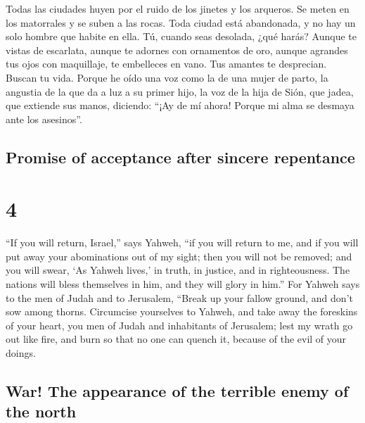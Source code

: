 \begin{paracol}{2}
 Todas las ciudades huyen por el ruido de los jinetes y
los arqueros. Se meten en los matorrales y se suben a las rocas. Toda
ciudad está abandonada, y no hay un solo hombre que habite en ella.
 Tú, cuando seas desolada, ¿qué harás? Aunque te vistas
de escarlata, aunque te adornes con ornamentos de oro, aunque agrandes
tus ojos con maquillaje, te embelleces en vano. Tus amantes te
desprecian. Buscan tu vida.  Porque he oído una voz como
la de una mujer de parto, la angustia de la que da a luz a su primer
hijo, la voz de la hija de Sión, que jadea, que extiende sus manos,
diciendo: ``¡Ay de mí ahora! Porque mi alma se desmaya ante los
asesinos''.

\switchcolumn
\begin{otherlanguage}{english}

\hypertarget{promise-of-acceptance-after-sincere-repentance}{%
\subsection{Promise of acceptance after sincere
repentance}\label{promise-of-acceptance-after-sincere-repentance}}

\hypertarget{section-7}{%
\section{4}\label{section-7}}

 ``If you will return, Israel,'' says Yahweh, ``if you
will return to me, and if you will put away your abominations out of my
sight; then you will not be removed;  and you will swear,
`As Yahweh lives,' in truth, in justice, and in righteousness. The
nations will bless themselves in him, and they will glory in him.''
 For Yahweh says to the men of Judah and to Jerusalem,
``Break up your fallow ground, and don't sow among thorns.
 Circumcise yourselves to Yahweh, and take away the
foreskins of your heart, you men of Judah and inhabitants of Jerusalem;
lest my wrath go out like fire, and burn so that no one can quench it,
because of the evil of your doings.

\hypertarget{war-the-appearance-of-the-terrible-enemy-of-the-north}{%
\subsection{War! The appearance of the terrible enemy of the
north}\label{war-the-appearance-of-the-terrible-enemy-of-the-north}}


\end{otherlanguage}
\end{paracol}
